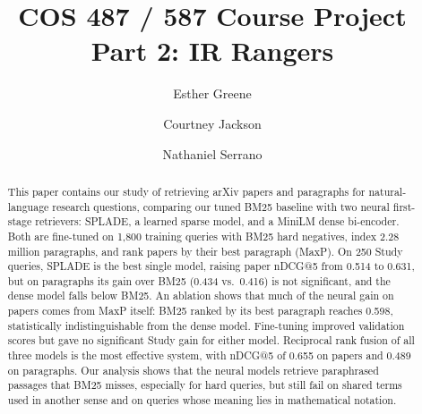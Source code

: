 \documentclass[sigconf,nonacm]{acmart}
\begin{document}
\title{COS 487 / 587 Course Project Part 2: IR Rangers}


\author{Esther Greene}

\author{Courtney Jackson}

\author{Nathaniel Serrano}

\begin{abstract}
This paper contains our study of retrieving arXiv papers and paragraphs for natural-language 
research questions, comparing our tuned BM25 baseline with two neural first-stage 
retrievers: SPLADE, a learned sparse model, and a MiniLM dense bi-encoder. Both are 
fine-tuned on 1,800 training queries with BM25 hard negatives, index 2.28 million 
paragraphs, and rank papers by their best paragraph (MaxP). On 250 Study queries, 
SPLADE is the best single model, raising paper nDCG@5 from 0.514 to 0.631, but on 
paragraphs its gain over BM25 (0.434 vs.\ 0.416) is not significant, and the dense 
model falls below BM25. An ablation shows that much of the neural gain on papers 
comes from MaxP itself: BM25 ranked by its best paragraph reaches 0.598, statistically 
indistinguishable from the dense model. Fine-tuning improved validation scores but 
gave no significant Study gain for either model. Reciprocal rank fusion of all three 
models is the most effective system, with nDCG@5 of 0.655 on papers and 0.489 on 
paragraphs. Our analysis shows that the neural models retrieve paraphrased passages 
that BM25 misses, especially for hard queries, but still fail on shared terms used 
in another sense and on queries whose meaning lies in mathematical notation.
\end{abstract}


\maketitle
\end{document}
